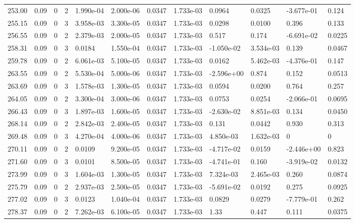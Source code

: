 \documentclass[preview]{standalone}
\begin{document}
{{{{{{\begin{tabular}{L{1.2cm}C{1.2cm} C{0.3cm}C{0.5cm} C{1.4cm}C{1.4cm} C{1.4cm}C{1.4cm} C{1.6cm}C{1.6cm} C{1.6cm}C{1.6cm}}
  253.00  &  0.09  & 0     &  2 &  1.990e-04  & 2.000e-06  &  0.0347&   1.733e-03& 0.0964 & 0.0325   &  -3.677e-01 & 0.124  \\ 
  255.15  &  0.09  & 0     &  3 &  3.958e-03  & 3.300e-05  &  0.0347&   1.733e-03& 0.0298 & 0.0100   &  0.396 & 0.133  \\ 
  256.55  &  0.09  & 0     &  2 &  2.379e-03  & 2.000e-05  &  0.0347&   1.733e-03& 0.517 & 0.174   &  -6.691e-02 & 0.0225  \\ 
  258.31  &  0.09  & 0     &  3 &  0.0184  & 1.550e-04  &  0.0347&   1.733e-03& -1.050e-02 & 3.534e-03   &  0.139 & 0.0467  \\ 
  259.78  &  0.09  & 0     &  2 &  6.061e-03  & 5.100e-05  &  0.0347&   1.733e-03& 0.0162 & 5.462e-03   &  -4.376e-01 & 0.147  \\ 
  263.55  &  0.09  & 0     &  2 &  5.530e-04  & 5.000e-06  &  0.0347&   1.733e-03& -2.596e+00 & 0.874   &  0.152 & 0.0513  \\ 
  263.69  &  0.09  & 0     &  3 &  1.578e-03  & 1.300e-05  &  0.0347&   1.733e-03& 0.0594 & 0.0200   &  0.764 & 0.257  \\ 
  264.05  &  0.09  & 0     &  2 &  3.300e-04  & 3.000e-06  &  0.0347&   1.733e-03& 0.0753 & 0.0254   &  -2.066e-01 & 0.0695  \\ 
  266.43  &  0.09  & 0     &  3 &  1.897e-03  & 1.600e-05  &  0.0347&   1.733e-03& -2.630e-02 & 8.851e-03   &  0.134 & 0.0450  \\ 
  268.14  &  0.09  & 0     &  2 &  2.842e-03  & 2.400e-05  &  0.0347&   1.733e-03& 0.131 & 0.0442   &  0.930 & 0.313  \\ 
  269.48  &  0.09  & 0     &  3 &  4.270e-04  & 4.000e-06  &  0.0347&   1.733e-03& 4.850e-03 & 1.632e-03   &  0 & 0  \\ 
  270.11  &  0.09  & 0     &  2 &  0.0109  & 9.200e-05  &  0.0347&   1.733e-03& -4.717e-02 & 0.0159   &  -2.446e+00 & 0.823  \\ 
  271.60  &  0.09  & 0     &  3 &  0.0101  & 8.500e-05  &  0.0347&   1.733e-03& -4.741e-01 & 0.160   &  -3.919e-02 & 0.0132  \\ 
  273.99  &  0.09  & 0     &  3 &  1.604e-03  & 1.300e-05  &  0.0347&   1.733e-03& 7.324e-03 & 2.465e-03   &  0.260 & 0.0874  \\ 
  275.79  &  0.09  & 0     &  2 &  2.937e-03  & 2.500e-05  &  0.0347&   1.733e-03& -5.691e-02 & 0.0192   &  0.275 & 0.0925  \\ 
  277.02  &  0.09  & 0     &  3 &  0.0123  & 1.040e-04  &  0.0347&   1.733e-03& 0.0829 & 0.0279   &  -7.779e-01 & 0.262  \\ 
  278.37  &  0.09  & 0     &  2 &  7.262e-03  & 6.100e-05  &  0.0347&   1.733e-03& 1.33 & 0.447   &  0.111 & 0.0375  \\ 
\hline 
\end{tabular} 

}}}}}}
\end{document}
